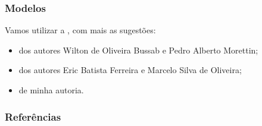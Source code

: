 \documentclass[12pt]{beamer}
\begin{document}
\begin{frame}{}
\frametitle{Modelos}
\begin{block}{}
\justifying
Vamos utilizar a , com mais as sugestões:
\begin{itemize}
    \item {} dos autores Wilton de Oliveira Bussab e Pedro Alberto Morettin;
    \item {} dos autores Eric Batista Ferreira e Marcelo Silva de Oliveira;
    \item {} de minha autoria.
\end{itemize}
\end{block}
\end{frame}

\begin{frame}[allowframebreaks]
\frametitle{\bf Referências}
\printbibliography
\end{frame}
\end{document}
